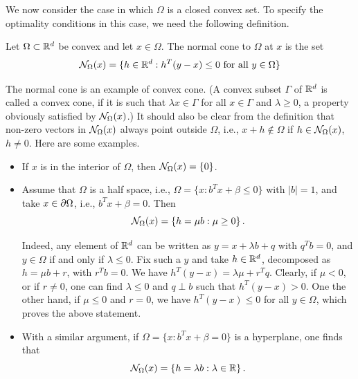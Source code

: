 We now consider the case in which $\Omega$ is a closed convex set. 
To specify the optimality conditions in this case, we need the following definition.
\begin{definition}
\label{def:normal.cone}
Let $\Omega\subset {\mathbb{R}}^d$ be convex and let $x\in \Omega$. The normal cone to $\Omega$ at $x$ is the set 
\begin{equation}
{\mathcal N}_\Omega(x) = \{h\in {\mathbb{R}}^d: h^T(y-x) \leq 0 \text{ for all } y \in\Omega\}
\label{eq:normal.cone}
\end{equation}
\end{definition}
The normal cone is an example of convex cone. (A convex subset  $\Gamma$  of ${\mathbb{R}}^d$ is called a convex cone, if it is such that $\lambda x \in \Gamma$ for all $x\in \Gamma$ and $\lambda \geq 0$, a property obviously satisfied by ${\mathcal N}_\Omega(x)$.) It should also be clear from the definition that  non-zero vectors in ${\mathcal N}_\Omega(x)$ always point outside $\Omega$, i.e.,  $x+h \not\in\Omega$ if $h\in{\mathcal N}_\Omega(x)$, $h\neq 0$.  Here are some examples.
\begin{itemize}[wide]
\item
If $x$ is in the interior of $\Omega$, then ${\mathcal N}_\Omega(x) = \{0\}$. 
\item Assume that $\Omega$ is a half space, i.e.,  $\Omega = \{x: b^Tx + \beta \leq 0\}$ with $|b|=1$, and take $x \in \partial\Omega$, i.e., $b^Tx + \beta = 0$.  Then
\[
 {\mathcal N}_\Omega(x) = \{h = \mu b: \mu\geq 0\}\,.
\]

Indeed, any element of ${\mathbb{R}}^d$ can be written as $y = x + \lambda b + q$ with $q^T b = 0$, and $y\in \Omega$ if and only if $\lambda \leq 0$. Fix such a $y$ and take $h\in {\mathbb{R}}^d$, decomposed as $h = \mu b + r$, with $r^Tb = 0$. We have $h^T(y-x) = \lambda\mu + r^Tq$. Clearly, if $\mu < 0$, or if $r \neq 0$, one can find $\lambda \leq 0$ and $q \perp b$ such that $h^T(y-x) > 0$. One the other hand, if $\mu \leq 0$ and $r=0$, we have $h^T(y-x)\leq 0$ for all $y\in \Omega$, which proves the above statement. 
\item
With a similar argument, if $\Omega = \{x: b^Tx + \beta = 0\}$ is a hyperplane, one finds that
\[
 {\mathcal N}_\Omega(x) = \{h = \lambda b: \lambda\in {\mathbb{R}} \}\,.
\]
\end{itemize}

